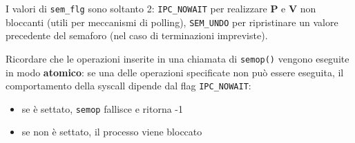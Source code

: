 \documentclass[a4paper]{article}
\begin{document}
I valori di \verb|sem_flg| sono soltanto 2: \verb|IPC_NOWAIT| per realizzare \textbf{P} e \textbf{V} non bloccanti (utili per meccanismi di polling), \verb|SEM_UNDO| per ripristinare un valore precedente del semaforo (nel caso di terminazioni impreviste).

Ricordare che le operazioni inserite in una chiamata di \verb|semop()| vengono eseguite in modo \textbf{atomico}: se una delle operazioni specificate non può essere eseguita, il comportamento della syscall dipende dal flag \verb|IPC_NOWAIT|:
\begin{itemize}
\item se è settato, \verb|semop| fallisce e ritorna -1
\item se non è settato, il processo viene bloccato
\end{itemize}
\end{document}
